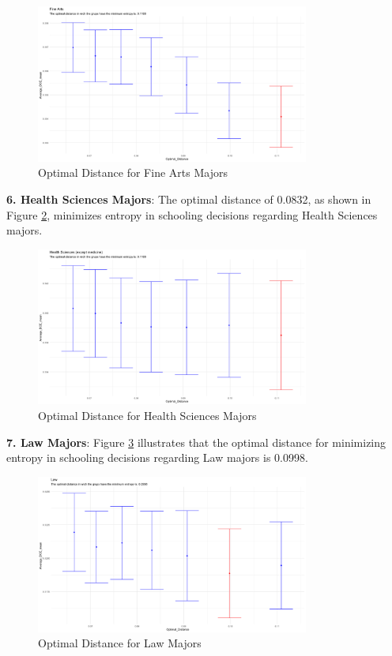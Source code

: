 \begin{figure}[htbp]
    \centering
    \includegraphics[width=0.8\textwidth]{Graph/Results/optimal_distance_bs30_FINE_ARTS.png}
    \caption{Optimal Distance for Fine Arts Majors}
    \label{fig:optimal_distance_fine_arts}
\end{figure}

\textbf{ 6. Health Sciences Majors}:
   The optimal distance of 0.0832, as shown in Figure \ref{fig:optimal_distance_health_sci}, minimizes entropy in schooling decisions regarding Health Sciences majors.

\begin{figure}[H]
    \centering
    \includegraphics[width=0.8\textwidth]{Graph/Results/optimal_distance_bs30_HEALTH_SCIENCES.png}
    \caption{Optimal Distance for Health Sciences Majors}
    \label{fig:optimal_distance_health_sci}
\end{figure}

\textbf{7. Law Majors}:
   Figure \ref{fig:optimal_distance_law} illustrates that the optimal distance for minimizing entropy in schooling decisions regarding Law majors is 0.0998.

\begin{figure}[H]
    \centering
    \includegraphics[width=0.8\textwidth]{Graph/Results/optimal_distance_bs30_LAW.png}
    \caption{Optimal Distance for Law Majors}
    \label{fig:optimal_distance_law}
\end{figure}

